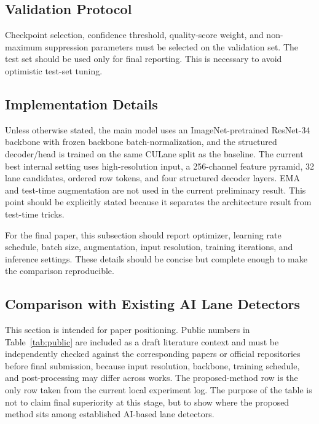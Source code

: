 \documentclass[conference]{IEEEtran}
\begin{document}
\subsection{Validation Protocol}

Checkpoint selection, confidence threshold, quality-score weight, and non-maximum suppression parameters must be selected on the validation set. The test set should be used only for final reporting. This is necessary to avoid optimistic test-set tuning.

\subsection{Implementation Details}

Unless otherwise stated, the main model uses an ImageNet-pretrained ResNet-34 backbone with frozen backbone batch-normalization, and the structured decoder/head is trained on the same CULane split as the baseline. The current best internal setting uses high-resolution input, a 256-channel feature pyramid, 32 lane candidates, ordered row tokens, and four structured decoder layers. EMA and test-time augmentation are not used in the current preliminary result. This point should be explicitly stated because it separates the architecture result from test-time tricks.

For the final paper, this subsection should report optimizer, learning rate schedule, batch size, augmentation, input resolution, training iterations, and inference settings. These details should be concise but complete enough to make the comparison reproducible.

\subsection{Comparison with Existing AI Lane Detectors}

This section is intended for paper positioning. Public numbers in Table~\ref{tab:public} are included as a draft literature context and must be independently checked against the corresponding papers or official repositories before final submission, because input resolution, backbone, training schedule, and post-processing may differ across works. The proposed-method row is the only row taken from the current local experiment log. The purpose of the table is not to claim final superiority at this stage, but to show where the proposed method sits among established AI-based lane detectors.
\end{document}
